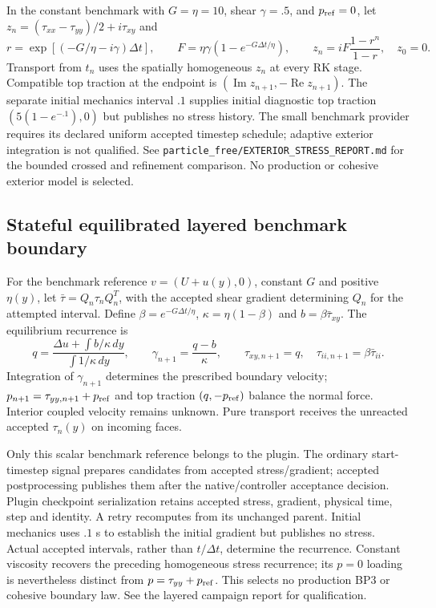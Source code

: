 \documentclass[11pt]{article}
\begin{document}
In the constant benchmark with $G=\eta=10$, shear $\gamma=.5$, and $p_{\rm ref}=0$,
let $z_n=(\tau_{xx}-\tau_{yy})/2+i\tau_{xy}$ and
\[
 r=\exp[(-G/\eta-i\gamma)\Delta t],\qquad
 F=\eta\gamma(1-e^{-G\Delta t/\eta}),\qquad
 z_n=iF\frac{1-r^n}{1-r},\quad z_0=0.
\]
Transport from $t_n$ uses the spatially homogeneous $z_n$ at every RK stage.
Compatible top traction at the endpoint is
$(\operatorname{Im}z_{n+1},-\operatorname{Re}z_{n+1})$.
The separate initial mechanics interval $.1$ supplies initial diagnostic top
traction $(5(1-e^{-.1}),0)$ but publishes no stress history. The small benchmark
provider requires its declared uniform accepted timestep schedule; adaptive
exterior integration is not qualified. See
\texttt{particle\_free/EXTERIOR\_STRESS\_REPORT.md} for the bounded crossed and
refinement comparison. No production or cohesive exterior model is selected.


\subsection{Stateful equilibrated layered benchmark boundary}
For the benchmark reference $v=(U+u(y),0)$, constant $G$ and positive $\eta(y)$,
let $\bar\tau=Q_n\tau_nQ_n^T$, with the accepted shear gradient determining
$Q_n$ for the attempted interval. Define $\beta=e^{-G\Delta t/\eta}$,
$\kappa=\eta(1-\beta)$ and $b=\beta\bar\tau_{xy}$. The equilibrium recurrence is
\[
 q=\frac{\Delta u+\int b/\kappa\,dy}{\int 1/\kappa\,dy},\qquad
 \gamma_{n+1}=\frac{q-b}{\kappa},\qquad
 \tau_{xy,n+1}=q,\quad \tau_{ii,n+1}=\beta\bar\tau_{ii}.
\]
Integration of $\gamma_{n+1}$ determines the prescribed boundary velocity;
$p_{n+1}=\tau_{yy,n+1}+p_{\rm ref}$ and top traction $(q,-p_{\rm ref})$
balance the normal force. Interior coupled velocity remains unknown. Pure
transport receives the unreacted accepted $\tau_n(y)$ on incoming faces.

Only this scalar benchmark reference belongs to the plugin. The ordinary
start-timestep signal prepares candidates from accepted stress/gradient; accepted
postprocessing publishes them after the native/controller acceptance decision.
Plugin checkpoint serialization retains accepted stress, gradient, physical time,
step and identity. A retry recomputes from its unchanged parent. Initial mechanics
uses $.1$ s to establish the initial gradient but publishes no stress. Actual
accepted intervals, rather than $t/\Delta t$, determine the recurrence. Constant
viscosity recovers the preceding homogeneous stress recurrence; its $p=0$ loading
is nevertheless distinct from $p=\tau_{yy}+p_{\rm ref}$. This selects no production
BP3 or cohesive boundary law. See the layered campaign report for qualification.
\end{document}
